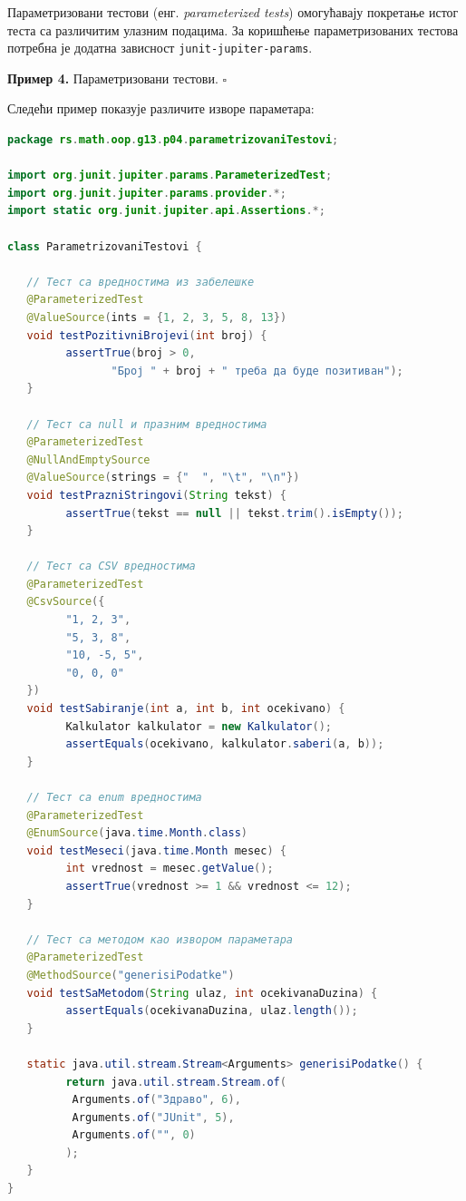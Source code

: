 Параметризовани тестови (енг. \textit{parameterized tests}) омогућавају покретање истог теста са различитим улазним подацима. За коришћење параметризованих тестова потребна је додатна зависност \texttt{junit-jupiter-params}.


\bigskip

\noindent \textbf{Пример 4.} Параметризовани тестови. $\square$

\medskip

Следећи пример показује различите изворе параметара:


\begin{lstlisting}[language=Java]
package rs.math.oop.g13.p04.parametrizovaniTestovi;
 
import org.junit.jupiter.params.ParameterizedTest;
import org.junit.jupiter.params.provider.*;
import static org.junit.jupiter.api.Assertions.*;
 
class ParametrizovaniTestovi {
 
   // Тест са вредностима из забелешке
   @ParameterizedTest
   @ValueSource(ints = {1, 2, 3, 5, 8, 13})
   void testPozitivniBrojevi(int broj) {
         assertTrue(broj > 0,
                "Број " + broj + " треба да буде позитиван");
   }
 
   // Тест са null и празним вредностима
   @ParameterizedTest
   @NullAndEmptySource
   @ValueSource(strings = {"  ", "\t", "\n"})
   void testPrazniStringovi(String tekst) {
         assertTrue(tekst == null || tekst.trim().isEmpty());
   }
 
   // Тест са CSV вредностима
   @ParameterizedTest
   @CsvSource({
         "1, 2, 3",
         "5, 3, 8",
         "10, -5, 5",
         "0, 0, 0"
   })
   void testSabiranje(int a, int b, int ocekivano) {
         Kalkulator kalkulator = new Kalkulator();
         assertEquals(ocekivano, kalkulator.saberi(a, b));
   }
 
   // Тест са enum вредностима
   @ParameterizedTest
   @EnumSource(java.time.Month.class)
   void testMeseci(java.time.Month mesec) {
         int vrednost = mesec.getValue();
         assertTrue(vrednost >= 1 && vrednost <= 12);
   }
 
   // Тест са методом као извором параметара
   @ParameterizedTest
   @MethodSource("generisiPodatke")
   void testSaMetodom(String ulaz, int ocekivanaDuzina) {
         assertEquals(ocekivanaDuzina, ulaz.length());
   }
 
   static java.util.stream.Stream<Arguments> generisiPodatke() {
         return java.util.stream.Stream.of(
          Arguments.of("Здраво", 6),
          Arguments.of("JUnit", 5),
          Arguments.of("", 0)
         );
   }
}
\end{lstlisting}


